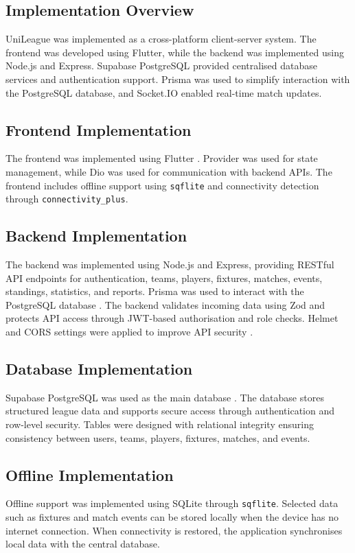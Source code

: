 \documentclass[12pt,a4paper]{report}
\begin{document}
\subsection{Implementation Overview}
UniLeague was implemented as a cross-platform client-server system. The frontend was developed
using Flutter, while the backend was implemented using Node.js and Express. Supabase PostgreSQL
provided centralised database services and authentication support. Prisma was used to simplify
interaction with the PostgreSQL database, and Socket.IO enabled real-time match updates.

\subsection{Frontend Implementation}
The frontend was implemented using Flutter \cite{flutter2024}. Provider was used for state
management, while Dio was used for communication with backend APIs. The frontend includes
offline support using \texttt{sqflite} and connectivity detection through \texttt{connectivity\_plus}.

\subsection{Backend Implementation}
The backend was implemented using Node.js and Express, providing RESTful API endpoints for
authentication, teams, players, fixtures, matches, events, standings, statistics, and reports.
Prisma was used to interact with the PostgreSQL database \cite{prisma2024}. The backend
validates incoming data using Zod and protects API access through JWT-based authorisation
and role checks. Helmet and CORS settings were applied to improve API security \cite{helmet2024}.

\subsection{Database Implementation}
Supabase PostgreSQL was used as the main database \cite{supabase2024}. The database stores
structured league data and supports secure access through authentication and row-level security.
Tables were designed with relational integrity ensuring consistency between users, teams, players,
fixtures, matches, and events.

\subsection{Offline Implementation}
Offline support was implemented using SQLite through \texttt{sqflite}. Selected data such as
fixtures and match events can be stored locally when the device has no internet connection.
When connectivity is restored, the application synchronises local data with the central database.
\end{document}
